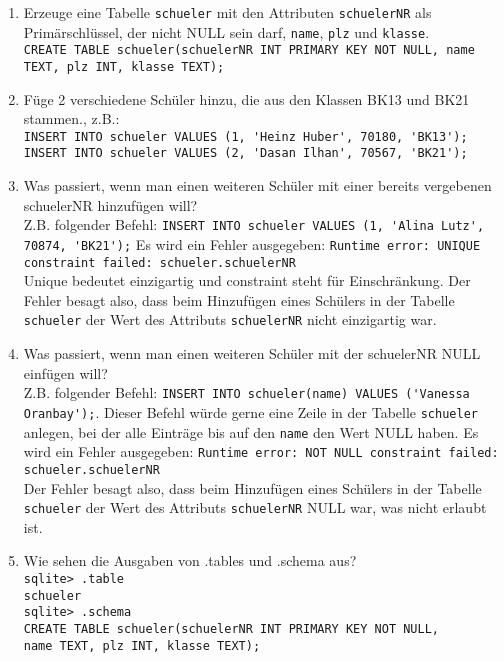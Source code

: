 \begin{Answer}[ref=Befuellen]
	\begin{enumerate}
		\item Erzeuge eine Tabelle \lstinline!schueler! mit den Attributen \lstinline!schuelerNR! als Primärschlüssel, der nicht NULL sein darf, \lstinline!name!, \lstinline!plz! und \lstinline!klasse!.\\
		\lstinline[breaklines=true]!CREATE TABLE schueler(schuelerNR INT PRIMARY KEY NOT NULL, name TEXT, plz INT, klasse TEXT);!
		\item Füge 2 verschiedene Schüler hinzu, die aus den Klassen BK13 und BK21 stammen., z.B.:\\
		\lstinline!INSERT INTO schueler VALUES (1, 'Heinz Huber', 70180, 'BK13');!\\
		\lstinline!INSERT INTO schueler VALUES (2, 'Dasan Ilhan', 70567, 'BK21');!\\
		\item Was passiert, wenn man einen weiteren Schüler mit einer bereits vergebenen schuelerNR hinzufügen will?\\
		Z.B. folgender Befehl: \lstinline!INSERT INTO schueler VALUES (1, 'Alina Lutz', 70874, 'BK21');!
		Es wird ein Fehler ausgegeben: \lstinline!Runtime error: UNIQUE constraint failed: schueler.schuelerNR!\\
		Unique bedeutet einzigartig und constraint steht für Einschränkung. Der Fehler besagt also, dass beim Hinzufügen eines Schülers in der Tabelle \lstinline!schueler! der Wert des Attributs \lstinline!schuelerNR! nicht einzigartig war.
		\item Was passiert, wenn man einen weiteren Schüler mit der schuelerNR NULL einfügen will?\\
		Z.B. folgender Befehl: \lstinline!INSERT INTO schueler(name) VALUES ('Vanessa Oranbay');!. Dieser Befehl würde gerne eine Zeile in der Tabelle \lstinline!schueler! anlegen, bei der alle Einträge bis auf den \lstinline!name! den Wert NULL haben.
		Es wird ein Fehler ausgegeben: \lstinline!Runtime error: NOT NULL constraint failed: schueler.schuelerNR!\\
		Der Fehler besagt also, dass beim Hinzufügen eines Schülers in der Tabelle \lstinline!schueler! der Wert des Attributs \lstinline!schuelerNR! NULL war, was nicht erlaubt ist.
		\item Wie sehen die Ausgaben von .tables und .schema aus?\\
		\lstinline!sqlite> .table!\\
		\lstinline!schueler!\\
		\lstinline!sqlite> .schema!\\
		\lstinline!CREATE TABLE schueler(schuelerNR INT PRIMARY KEY NOT NULL,!\\
		\lstinline!name TEXT, plz INT, klasse TEXT);!
	\end{enumerate}
\end{Answer}